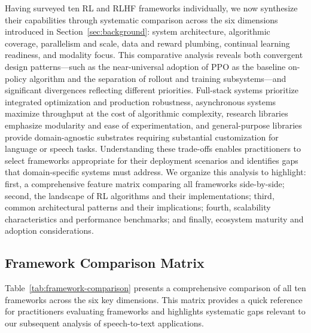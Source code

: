 \documentclass[conference]{IEEEtran}
\begin{document}
Having surveyed ten RL and RLHF frameworks individually, we now synthesize their capabilities through systematic comparison across the six dimensions introduced in Section~\ref{sec:background}: system architecture, algorithmic coverage, parallelism and scale, data and reward plumbing, continual learning readiness, and modality focus. This comparative analysis reveals both convergent design patterns—such as the near-universal adoption of PPO as the baseline on-policy algorithm and the separation of rollout and training subsystems—and significant divergences reflecting different priorities. Full-stack systems prioritize integrated optimization and production robustness, asynchronous systems maximize throughput at the cost of algorithmic complexity, research libraries emphasize modularity and ease of experimentation, and general-purpose libraries provide domain-agnostic substrates requiring substantial customization for language or speech tasks. Understanding these trade-offs enables practitioners to select frameworks appropriate for their deployment scenarios and identifies gaps that domain-specific systems must address. We organize this analysis to highlight: first, a comprehensive feature matrix comparing all frameworks side-by-side; second, the landscape of RL algorithms and their implementations; third, common architectural patterns and their implications; fourth, scalability characteristics and performance benchmarks; and finally, ecosystem maturity and adoption considerations.

\subsection{Framework Comparison Matrix}

Table~\ref{tab:framework-comparison} presents a comprehensive comparison of all ten frameworks across the six key dimensions. This matrix provides a quick reference for practitioners evaluating frameworks and highlights systematic gaps relevant to our subsequent analysis of speech-to-text applications.
\end{document}
